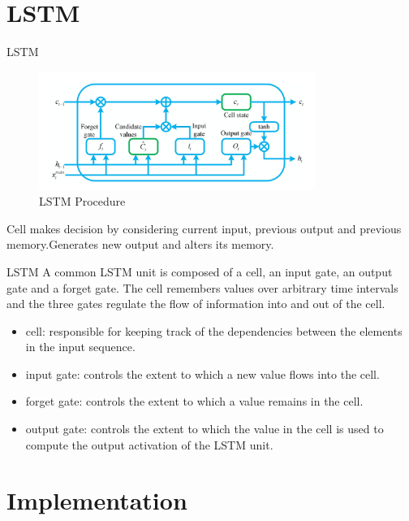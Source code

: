 \documentclass[14pt,aspectratio=169]{beamer}
\newcommand{\IMP}{Implementation}
\newcommand{\LS}{LSTM}
\begin{document}
\section{\LS}
\begin{frame}{\LS}
\begin{figure}[htp]
    \centering
    \includegraphics[width=9cm]{LSTM.png}
    \caption{LSTM Procedure}
    \label{fig:LSTM}
\end{figure}
Cell makes decision by considering current input, previous output and previous memory.Generates new output and alters its memory.
\end{frame}

\begin{frame}{\LS}
A common LSTM unit is composed of a cell, an input gate, an output gate and a 
forget gate. The cell remembers values over arbitrary time intervals and the three gates regulate the flow of information into and out of the cell.
\begin{itemize}
    \item cell: responsible for keeping track of the dependencies between the elements in the input sequence. \\
    \item input gate: controls the extent to which a new value flows into the cell. \\
    \item forget gate: controls the extent to which a value remains in the cell. \\
    \item output gate: controls the extent to which the value in the cell is used to compute the output activation of the LSTM unit. 
\end{itemize}
\end{frame}

\section{\IMP}
\end{document}
